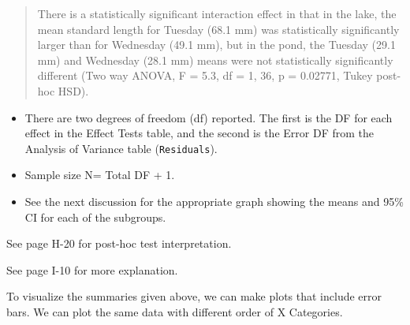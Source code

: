\documentclass[twoside, 12pt]{article}
\newenvironment{Shaded}{\begin{snugshade}}{\end{snugshade}}
\newcommand{\KeywordTok}[1]{\textcolor[rgb]{0.13,0.29,0.53}{\textbf{{#1}}}}
\newcommand{\DataTypeTok}[1]{\textcolor[rgb]{0.13,0.29,0.53}{{#1}}}
\newcommand{\FloatTok}[1]{\textcolor[rgb]{0.00,0.00,0.81}{{#1}}}
\newcommand{\StringTok}[1]{\textcolor[rgb]{0.31,0.60,0.02}{{#1}}}
\newcommand{\NormalTok}[1]{{#1}}
\begin{document}
\begin{quote}
There is a statistically significant interaction effect in that in the
lake, the mean standard length for Tuesday (68.1 mm) was statistically
significantly larger than for Wednesday (49.1 mm), but in the pond, the
Tuesday (29.1 mm) and Wednesday (28.1 mm) means were not statistically
significantly different (Two way ANOVA, F = 5.3, df = 1, 36, p =
0.02771, Tukey post-hoc HSD).
\end{quote}

\begin{itemize}
\item
  There are two degrees of freedom (df) reported. The first is the DF
  for each effect in the Effect Tests table, and the second is the Error
  DF from the Analysis of Variance table (\texttt{Residuals}).
\item
  Sample size N= Total DF + 1.
\item
  See the next discussion for the appropriate graph showing the means
  and 95\% CI for each of the subgroups.
\end{itemize}

See page H-20 for post-hoc test interpretation.

See page I-10 for more explanation.

\newpage

To visualize the summaries given above, we can make plots that include
error bars. We can plot the same data with different order of X
Categories.

\begin{Shaded}
\end{Shaded}
\end{document}
